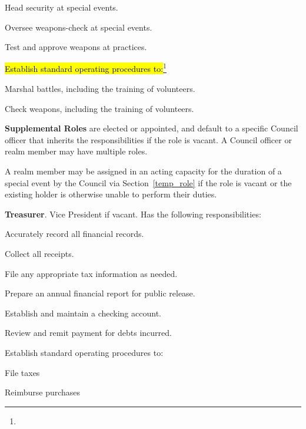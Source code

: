 \documentclass[12pt]{article}
\newcommand{\newpart}[2][]{\hl{#2}\expandafter\ifx\expandafter\relax\detokenize{#1}\relax\else\textnormal{\footnote{#1}}\fi}
\begin{document}
\begin{level}
\begin{level}
\begin{level}
            \item Head security at special events.
            \item Oversee weapons-check at special events.
            \item Test and approve weapons at practices.
            \item \newpart{Establish standard operating procedures to:}
            \begin{level}
                \item Marshal battles, including the training of volunteers.
                \item Check weapons, including the training of volunteers.
            \end{level}
        \end{level}
\end{level}
\item \textbf{Supplemental Roles} are elected or appointed, and default to a specific Council officer that inherits the responsibilities if the role is vacant. A Council officer or realm member may have multiple roles.\label{supplemental_roles}
\begin{level}
    \item A realm member may be assigned in an acting capacity for the duration of a special event by the Council via Section~\ref{temp_role} if the role is vacant or the existing holder is otherwise unable to perform their duties.
    \item \textbf{Treasurer}. Vice President if vacant. Has the following responsibilities:
    \begin{level}
        \item Accurately record all financial records.
        \item Collect all receipts.
        \item File any appropriate tax information as needed.
        \item Prepare an annual financial report for public release.
        \item Establish and maintain a checking account.
        \item Review and remit payment for debts incurred.
        \item Establish standard operating procedures to:
        \begin{level}
            \item File taxes
            \item Reimburse purchases
        \end{level}

\end{level}
\end{level}
\end{level}
\end{document}
